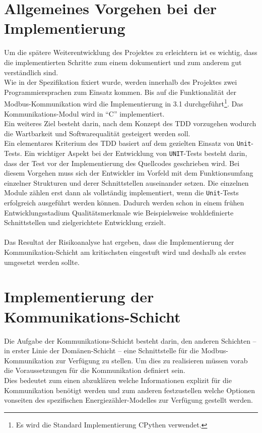 \documentclass[Bachelorarbeit.tex]{subfiles}
\begin{document}
\section{Allgemeines Vorgehen bei der Implementierung}
Um die spätere Weiterentwicklung des Projektes zu erleichtern ist es wichtig, dass die implementierten Schritte zum einem dokumentiert und zum anderem gut verständlich sind. \\
Wie in der Spezifikation fixiert wurde, werden innerhalb des Projektes zwei Programmiersprachen zum Einsatz kommen. Bis auf die Funktionalität der Modbus-Kommunikation wird die Implementierung in 3.1 durchgeführt\footnote{Es wird die Standard Implementierung CPythen verwendet.}. Das Kommunikations-Modul wird in "`C"' implementiert.\\ 
Ein weiteres Ziel besteht darin, nach dem Konzept des \ac{TDD} vorzugehen wodurch die Wartbarkeit und Softwarequalität gesteigert werden soll.\\
Ein elementares Kriterium des \ac{TDD} basiert auf dem gezielten Einsatz von \texttt{Unit}-Tests. 
Ein wichtiger Aspekt bei der Entwicklung von \texttt{UNIT}-Tests besteht darin, dass der Test vor der Implementierung des Quellcodes geschrieben wird. 
Bei diesem Vorgehen muss sich der Entwickler im Vorfeld mit dem Funktionsumfang einzelner Strukturen und derer Schnittstellen auseinander setzen. 
Die einzelnen Module zählen erst dann als vollständig implementiert, wenn die \texttt{Unit}-Tests erfolgreich ausgeführt werden können. 
Dadurch werden schon in einem frühen Entwicklungsstadium Qualitätsmerkmale wie Beispielsweise wohldefinierte Schnittstellen und zielgerichtete Entwicklung erzielt.\\
%
\\Das Resultat der Risikoanalyse hat ergeben, dass die Implementierung der Kommunikation-Schicht am kritischsten eingestuft wird und deshalb als erstes umgesetzt werden sollte.  

\section{Implementierung der Kommunikations-Schicht}
\label{sec:impl_der_kommunikationsschicht}
Die Aufgabe der Kommunikations-Schicht besteht darin, den anderen Schichten – in erster Linie der Domänen-Schicht – eine Schnittstelle für die Modbus-Kommunikation zur Verfügung zu stellen. 
Um dies zu realisieren müssen vorab die Voraussetzungen für die Kommunikation definiert sein.\\
Dies bedeutet zum einen abzuklären welche Informationen explizit für die Kommunikation benötigt werden und zum anderen festzustellen welche Optionen vonseiten des spezifischen Energiezähler-Modelles zur Verfügung gestellt werden.
\end{document}
